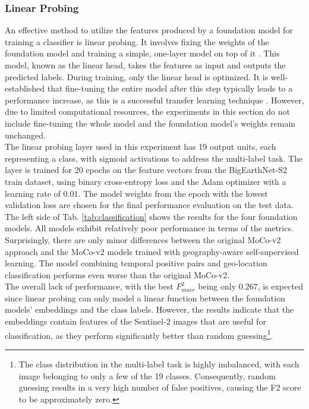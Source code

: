 \subsubsection{Linear Probing}
An effective method to utilize the features produced by a foundation model for training a classifier is linear probing. It involves fixing the weights of the foundation model and training a simple, one-layer model on top of it \cite{linProb}. This model, known as the linear head, takes the features as input and outputs the predicted labels. During training, only the linear head is optimized. It is well-established that fine-tuning the entire model after this step typically leads to a performance increase, as this is a successful transfer learning technique \cite{linProb}. However, due to limited computational resources, the experiments in this section do not include fine-tuning the whole model and the foundation model's weights remain unchanged. \\
The linear probing layer used in this experiment has 19 output units, each representing a class, with sigmoid activations to address the multi-label task. The layer is trained for 20 epochs on the feature vectors from the BigEarthNet-S2 train dataset, using binary cross-entropy loss and the Adam optimizer with a learning rate of $0.01$. The model weights from the epoch with the lowest validation loss are chosen for the final performance evaluation on the test data. \\
The left side of Tab. \ref{tab:classification} shows the results for the four foundation models. All models exhibit relatively poor performance in terms of the metrics. Surprisingly, there are only minor differences between the original MoCo-v2 approach and the MoCo-v2 models trained with geography-aware self-supervised learning. The model combining temporal positive pairs and geo-location classification performs even worse than the original MoCo-v2. \\
The overall lack of performance, with the best $F_{macr}^2$ being only $0.267$, is expected since linear probing can only model a linear function between the foundation models' embeddings and the class labels. However, the results indicate that the embeddings contain features of the Sentinel-2 images that are useful for classification, as they perform significantly better than random guessing\footnote{The class distribution in the multi-label task is highly imbalanced, with each image belonging to only a few of the 19 classes. Consequently, random guessing results in a very high number of false positives, causing the F2 score to be approximately zero.}.  

